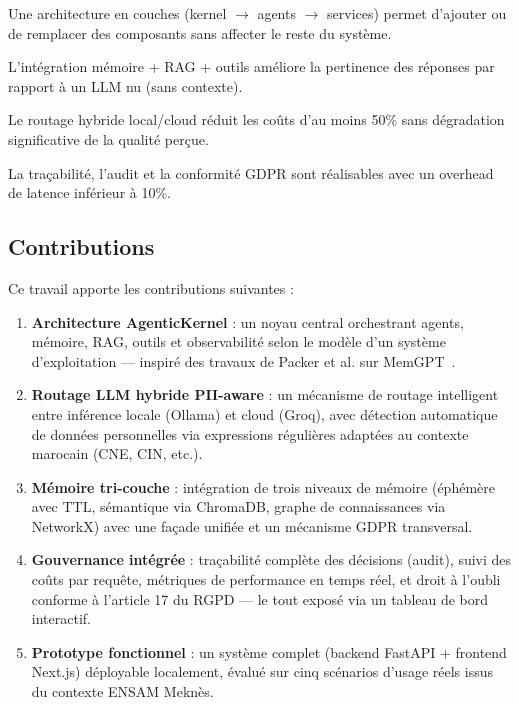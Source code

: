 \documentclass[12pt, a4paper]{article}
\newcommand{\acrshort}[1]{\MakeUppercase{#1}}
\begin{document}
\begin{description}[leftmargin=2cm]
  \item[\textbf{H1 — Modularité}] Une architecture en couches (kernel $\rightarrow$ agents $\rightarrow$ services) permet d'ajouter ou de remplacer des composants sans affecter le reste du système.
  \item[\textbf{H2 — Qualité}] L'intégration mémoire + RAG + outils améliore la pertinence des réponses par rapport à un \acrshort{llm} nu (sans contexte).
  \item[\textbf{H3 — Coût}] Le routage hybride local/cloud réduit les coûts d'au moins 50\% sans dégradation significative de la qualité perçue.
  \item[\textbf{H4 — Gouvernance}] La traçabilité, l'audit et la conformité \acrshort{gdpr} sont réalisables avec un overhead de latence inférieur à 10\%.
\end{description}

\subsection{Contributions}

Ce travail apporte les contributions suivantes :

\begin{enumerate}
  \item \textbf{Architecture AgenticKernel} : un noyau central orchestrant agents, mémoire, RAG, outils et observabilité selon le modèle d'un système d'exploitation — inspiré des travaux de Packer et al. sur MemGPT~\cite{packer2023memgpt}.

  \item \textbf{Routage LLM hybride PII-aware} : un mécanisme de routage intelligent entre inférence locale (Ollama) et cloud (Groq), avec détection automatique de données personnelles via expressions régulières adaptées au contexte marocain (CNE, CIN, etc.).

  \item \textbf{Mémoire tri-couche} : intégration de trois niveaux de mémoire (éphémère avec TTL, sémantique via ChromaDB, graphe de connaissances via NetworkX) avec une façade unifiée et un mécanisme GDPR transversal.

  \item \textbf{Gouvernance intégrée} : traçabilité complète des décisions (audit), suivi des coûts par requête, métriques de performance en temps réel, et droit à l'oubli conforme à l'article 17 du RGPD — le tout exposé via un tableau de bord interactif.

  \item \textbf{Prototype fonctionnel} : un système complet (backend FastAPI + frontend Next.js) déployable localement, évalué sur cinq scénarios d'usage réels issus du contexte ENSAM Meknès.
\end{enumerate}
\end{document}
